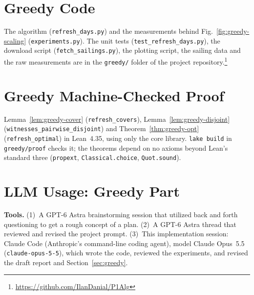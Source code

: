 
\section{Greedy Code}
\label{app:greedy-code}

The algorithm (\texttt{refresh\_days.py}) and the measurements behind
Fig.~\ref{fig:greedy-scaling} (\texttt{experiments.py}). The unit tests
(\texttt{test\_refresh\_days.py}), the download script
(\texttt{fetch\_sailings.py}), the plotting script, the sailing data and the
raw measurements are in the \texttt{greedy/} folder of the project
repository.\footnote{\url{https://github.com/IlanDanial/P1Alg}}




\section{Greedy Machine-Checked Proof}
\label{app:greedy-lean}

Lemma~\ref{lem:greedy-cover} (\texttt{refresh\_covers}),
Lemma~\ref{lem:greedy-disjoint} (\texttt{witnesses\_pairwise\_disjoint}) and
Theorem~\ref{thm:greedy-opt} (\texttt{refresh\_optimal}) in Lean~4.35, using
only the core library. \texttt{lake build} in \texttt{greedy/proof} checks
it; the theorems depend on no axioms beyond Lean's standard three
(\texttt{propext}, \texttt{Classical.choice}, \texttt{Quot.sound}).



\section{LLM Usage: Greedy Part}
\label{app:greedy-llm}

\textbf{Tools.} (1)~A GPT-6 Astra brainstorming session that utilized back and forth questioning to get a rough concept of a plan. (2)~A GPT-6 Astra thread that reviewed and revised the project prompt. (3)~This
implementation session: Claude Code (Anthropic's command-line coding agent),
model Claude Opus~5.5 (\texttt{claude-opus-5-5}), which wrote the code, reviewed
the experiments, and revised the draft report and Section~\ref{sec:greedy}.

